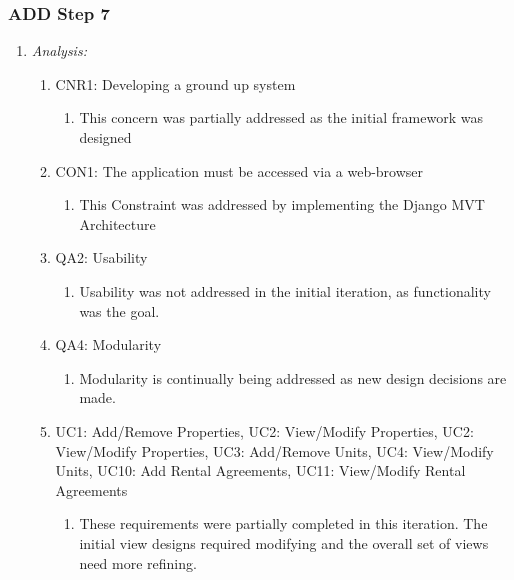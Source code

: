 \documentclass[11pt]{article}
\begin{document}
        \subsubsection{ADD Step 7}
            \begin{enumerate}
                \item \textit{Analysis:}
                    \begin{enumerate}
                        \item CNR1: Developing a ground up system
                            \begin{enumerate}
                                \item This concern was partially addressed as the initial framework was designed
                            \end{enumerate}
                        \item CON1: The application must be accessed via a web-browser
                            \begin{enumerate}
                                \item This Constraint was addressed by implementing the Django MVT Architecture
                            \end{enumerate}
                        \item QA2: Usability
                            \begin{enumerate}
                                \item Usability was not addressed in the initial iteration, as functionality was the goal.
                            \end{enumerate}
                        \item QA4: Modularity
                            \begin{enumerate}
                                \item Modularity is continually being addressed as new design decisions are made.
                            \end{enumerate}
                        \item UC1: Add/Remove Properties, UC2: View/Modify Properties, UC2: View/Modify Properties, UC3: Add/Remove Units, UC4: View/Modify Units, UC10: Add Rental Agreements, UC11: View/Modify Rental Agreements
                            \begin{enumerate}
                                \item These requirements were partially completed in this iteration. The initial view designs required modifying and the overall set of views need more refining.
                            \end{enumerate}
                    \end{enumerate}
            \end{enumerate}
\end{document}
